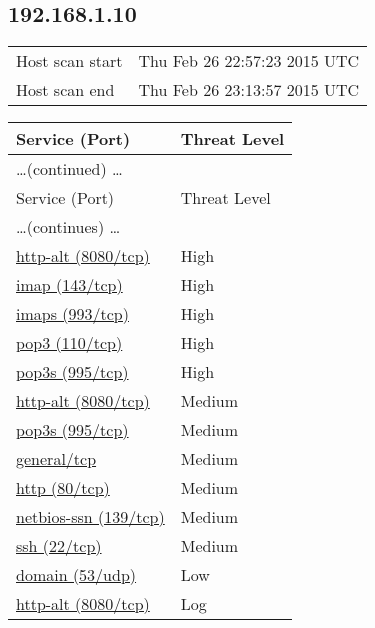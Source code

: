 \documentclass{article}
\begin{document}
\subsection{192.168.1.10}
\label{host:192.168.1.10}

\begin{tabular}{ll}
Host scan start&Thu Feb 26 22:57:23 2015 UTC\\
Host scan end&Thu Feb 26 23:13:57 2015 UTC\\
\end{tabular}

\begin{longtable}{|l|l|}
\hline
\rowcolor{openvas_report}Service (Port)&Threat Level\\
\hline
\endfirsthead
\multicolumn{2}{l}{\hfill\ldots (continued) \ldots}\\
\hline
\rowcolor{openvas_report}Service (Port)&Threat Level\\
\hline
\endhead
\hline
\multicolumn{2}{l}{\ldots (continues) \ldots}\\
\endfoot
\hline
\endlastfoot
\hline
\hyperref[port:192.168.1.10 http-alt (8080/tcp) High]{http-alt (8080/tcp)}&High\\
\hline
\hyperref[port:192.168.1.10 imap (143/tcp) High]{imap (143/tcp)}&High\\
\hline
\hyperref[port:192.168.1.10 imaps (993/tcp) High]{imaps (993/tcp)}&High\\
\hline
\hyperref[port:192.168.1.10 pop3 (110/tcp) High]{pop3 (110/tcp)}&High\\
\hline
\hyperref[port:192.168.1.10 pop3s (995/tcp) High]{pop3s (995/tcp)}&High\\
\hline
\hyperref[port:192.168.1.10 http-alt (8080/tcp) Medium]{http-alt (8080/tcp)}&Medium\\
\hline
\hyperref[port:192.168.1.10 pop3s (995/tcp) Medium]{pop3s (995/tcp)}&Medium\\
\hline
\hyperref[port:192.168.1.10 general/tcp Medium]{general/tcp}&Medium\\
\hline
\hyperref[port:192.168.1.10 http (80/tcp) Medium]{http (80/tcp)}&Medium\\
\hline
\hyperref[port:192.168.1.10 netbios-ssn (139/tcp) Medium]{netbios-ssn (139/tcp)}&Medium\\
\hline
\hyperref[port:192.168.1.10 ssh (22/tcp) Medium]{ssh (22/tcp)}&Medium\\
\hline
\hyperref[port:192.168.1.10 domain (53/udp) Low]{domain (53/udp)}&Low\\
\hline
\hyperref[port:192.168.1.10 http-alt (8080/tcp) Log]{http-alt (8080/tcp)}&Log\\

\end{longtable}
\end{document}
